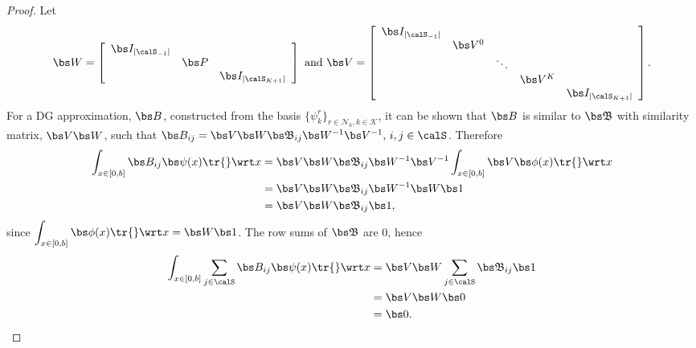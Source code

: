 \begin{proof}
Let 
\[ \bs W = \left[\begin{array}{ccc}
		\bs I_{|\calS_{-1}|} & & \\
		& \bs P &  \\
		& & \bs I_{|\calS_{K+1}|}
	\end{array}\right]
\mbox{ and }
  \bs V = \left[\begin{array}{ccccc}
		\bs I_{|\calS_{-1}|} & & & &  \\
		& \bs V^0 & & &  \\
		& & \ddots & & \\
		& & & \bs V^K \\
		& & & & \bs I_{|\calS_{K+1}|}
	\end{array}\right]. \]
For a DG approximation, \(\bs B\), constructed from the basis \(\{\psi^r_k\}_{r\in\mathcal N_k,k\in\mathcal K}\), it can be shown that \(\bs B\) is similar to \( {  {\mathfrak{\bs B}}}\) with similarity matrix, \(\bs V\bs W\), such that \(  \bs B_{ij} =  \bs V\bs W{ \mathfrak{\bs B}}_{ij}\bs W^{-1}\bs V^{-1},\,i,j\in\calS\).
Therefore 
\begin{align*} 
	\int_{x\in[0,b]}  \bs B_{ij}\bs\psi(x)\tr{} \wrt x &= \bs V\bs W { \mathfrak{\bs B}}_{ij}\bs W^{-1}\bs V^{-1}\int_{x\in[0,b]} \bs V\bs \phi(x)\tr{}\wrt x 
	\\&=\bs V\bs W { \mathfrak{\bs B}}_{ij}\bs W^{-1} \bs W\bs 1 \\&= \bs V \bs W { \mathfrak{\bs B}}_{ij}\bs 1,
\end{align*}
since \(\displaystyle\int_{x\in[0,b]} \bs \phi(x)\tr{}\wrt x =\bs W\bs 1\).
The row sums of \(\mathfrak{\bs B}\) are 0, hence 
\begin{align}\label{eqn:Bsums0} 
	\int_{x\in[0,b]}  \sum_{j\in\calS}\bs B_{ij}\bs\psi(x)\tr{} \wrt x  &=  \bs V\bs W \sum_{j\in\calS}{ \mathfrak{\bs B}}_{ij}\bs 1 \\&=  \bs V\bs W \bs 0 \\&= \bs 0.
\end{align}


\end{proof}
